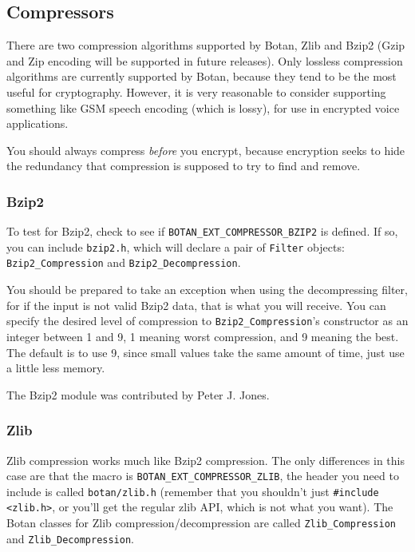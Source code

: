 \documentclass{article}
\newcommand{\filename}[1]{\texttt{#1}}
\newcommand{\macro}[1]{\texttt{#1}}
\newcommand{\type}[1]{\texttt{#1}}
\begin{document}
\subsection{Compressors}

There are two compression algorithms supported by Botan, Zlib and Bzip2 (Gzip
and Zip encoding will be supported in future releases). Only lossless
compression algorithms are currently supported by Botan, because they tend to
be the most useful for cryptography. However, it is very reasonable to consider
supporting something like GSM speech encoding (which is lossy), for use in
encrypted voice applications.

You should always compress \emph{before} you encrypt, because encryption seeks
to hide the redundancy that compression is supposed to try to find and remove.

\subsubsection{Bzip2}

To test for Bzip2, check to see if \macro{BOTAN\_EXT\_COMPRESSOR\_BZIP2} is
defined. If so, you can include \filename{bzip2.h}, which will declare a pair
of \type{Filter} objects: \type{Bzip2\_Compression} and
\type{Bzip2\_Decompression}.

You should be prepared to take an exception when using the decompressing
filter, for if the input is not valid Bzip2 data, that is what you will
receive. You can specify the desired level of compression to
\type{Bzip2\_Compression}'s constructor as an integer between 1 and 9, 1
meaning worst compression, and 9 meaning the best. The default is to use 9,
since small values take the same amount of time, just use a little less memory.

The Bzip2 module was contributed by Peter J. Jones.

\subsubsection{Zlib}

Zlib compression works much like Bzip2 compression. The only
differences in this case are that the macro is
\macro{BOTAN\_EXT\_COMPRESSOR\_ZLIB}, the header you need to include
is called \filename{botan/zlib.h} (remember that you shouldn't just
\verb|#include <zlib.h>|, or you'll get the regular zlib API, which is
not what you want). The Botan classes for Zlib
compression/decompression are called \type{Zlib\_Compression} and
\type{Zlib\_Decompression}.
\end{document}
